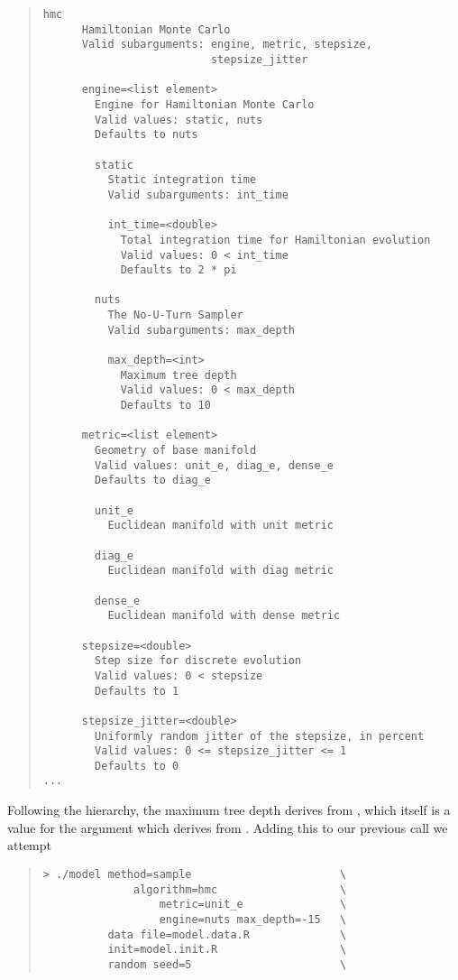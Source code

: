 \begin{quote}
\begin{Verbatim}[fontsize=\small]
    hmc
      Hamiltonian Monte Carlo
      Valid subarguments: engine, metric, stepsize,
                          stepsize_jitter

      engine=<list element>
        Engine for Hamiltonian Monte Carlo
        Valid values: static, nuts
        Defaults to nuts

        static
          Static integration time
          Valid subarguments: int_time

          int_time=<double>
            Total integration time for Hamiltonian evolution
            Valid values: 0 < int_time
            Defaults to 2 * pi

        nuts
          The No-U-Turn Sampler
          Valid subarguments: max_depth

          max_depth=<int>
            Maximum tree depth
            Valid values: 0 < max_depth
            Defaults to 10

      metric=<list element>
        Geometry of base manifold
        Valid values: unit_e, diag_e, dense_e
        Defaults to diag_e

        unit_e
          Euclidean manifold with unit metric

        diag_e
          Euclidean manifold with diag metric

        dense_e
          Euclidean manifold with dense metric

      stepsize=<double>
        Step size for discrete evolution
        Valid values: 0 < stepsize
        Defaults to 1

      stepsize_jitter=<double>
        Uniformly random jitter of the stepsize, in percent
        Valid values: 0 <= stepsize_jitter <= 1
        Defaults to 0
...
\end{Verbatim}
\end{quote}
%
Following the hierarchy, the maximum tree depth derives from ,
which itself is a value for the argument  which derives from
.  Adding this to our previous call we attempt
%
\begin{quote}
\begin{Verbatim}[fontshape=sl]
> ./model method=sample                       \
              algorithm=hmc                   \
                  metric=unit_e               \
                  engine=nuts max_depth=-15   \
          data file=model.data.R              \
          init=model.init.R                   \
          random seed=5                       \
\end{Verbatim}
\end{quote}
